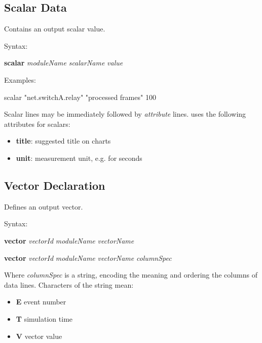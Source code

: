 \subsection{Scalar Data}
\label{sec:result-file-formats:opp:scalar-data}

Contains an output scalar value.

Syntax:

\hspace{20mm} \textbf{scalar} \textit{moduleName} \textit{scalarName} \textit{value}

Examples:

\begin{filelisting}
scalar "net.switchA.relay" "processed frames" 100
\end{filelisting}

Scalar lines may be immediately followed by \textit{attribute} lines.
{\opp} uses the following attributes for scalars:

\begin{itemize}
    \item \textbf{title}: suggested title on charts
    \item \textbf{unit}: measurement unit, e.g.  for seconds
\end{itemize}


\subsection{Vector Declaration}
\label{sec:result-file-formats:opp:vector-declaration}

Defines an output vector.

Syntax:

\hspace{20mm} \textbf{vector} \textit{vectorId} \textit{moduleName} \textit{vectorName}

\hspace{20mm} \textbf{vector} \textit{vectorId} \textit{moduleName} \textit{vectorName} \textit{columnSpec}

Where \textit{columnSpec} is a string, encoding the meaning and ordering
the columns of data lines. Characters of the string mean:

\begin{itemize}
  \item \textbf{E} event number
  \item \textbf{T} simulation time
  \item \textbf{V} vector value
\end{itemize}

